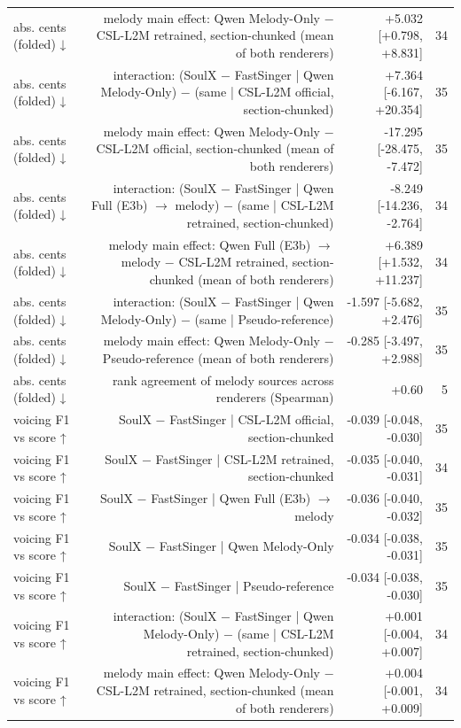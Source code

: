 \begin{table}[t]
\begin{tabular}{lrrr}
abs. cents (folded) ↓ & melody main effect: Qwen Melody-Only $-$ CSL-L2M retrained, section-chunked (mean of both renderers) & +5.032 [+0.798, +8.831] & 34 \\
abs. cents (folded) ↓ & interaction: (SoulX $-$ FastSinger | Qwen Melody-Only) $-$ (same | CSL-L2M official, section-chunked) & +7.364 [-6.167, +20.354] & 35 \\
abs. cents (folded) ↓ & melody main effect: Qwen Melody-Only $-$ CSL-L2M official, section-chunked (mean of both renderers) & -17.295 [-28.475, -7.472] & 35 \\
abs. cents (folded) ↓ & interaction: (SoulX $-$ FastSinger | Qwen Full (E3b) $\rightarrow$ melody) $-$ (same | CSL-L2M retrained, section-chunked) & -8.249 [-14.236, -2.764] & 34 \\
abs. cents (folded) ↓ & melody main effect: Qwen Full (E3b) $\rightarrow$ melody $-$ CSL-L2M retrained, section-chunked (mean of both renderers) & +6.389 [+1.532, +11.237] & 34 \\
abs. cents (folded) ↓ & interaction: (SoulX $-$ FastSinger | Qwen Melody-Only) $-$ (same | Pseudo-reference) & -1.597 [-5.682, +2.476] & 35 \\
abs. cents (folded) ↓ & melody main effect: Qwen Melody-Only $-$ Pseudo-reference (mean of both renderers) & -0.285 [-3.497, +2.988] & 35 \\
abs. cents (folded) ↓ & rank agreement of melody sources across renderers (Spearman) & +0.60 & 5 \\
voicing F1 vs score ↑ & SoulX $-$ FastSinger | CSL-L2M official, section-chunked & -0.039 [-0.048, -0.030] & 35 \\
voicing F1 vs score ↑ & SoulX $-$ FastSinger | CSL-L2M retrained, section-chunked & -0.035 [-0.040, -0.031] & 34 \\
voicing F1 vs score ↑ & SoulX $-$ FastSinger | Qwen Full (E3b) $\rightarrow$ melody & -0.036 [-0.040, -0.032] & 35 \\
voicing F1 vs score ↑ & SoulX $-$ FastSinger | Qwen Melody-Only & -0.034 [-0.038, -0.031] & 35 \\
voicing F1 vs score ↑ & SoulX $-$ FastSinger | Pseudo-reference & -0.034 [-0.038, -0.030] & 35 \\
voicing F1 vs score ↑ & interaction: (SoulX $-$ FastSinger | Qwen Melody-Only) $-$ (same | CSL-L2M retrained, section-chunked) & +0.001 [-0.004, +0.007] & 34 \\
voicing F1 vs score ↑ & melody main effect: Qwen Melody-Only $-$ CSL-L2M retrained, section-chunked (mean of both renderers) & +0.004 [-0.001, +0.009] & 34 \\

\end{tabular}
\end{table}

